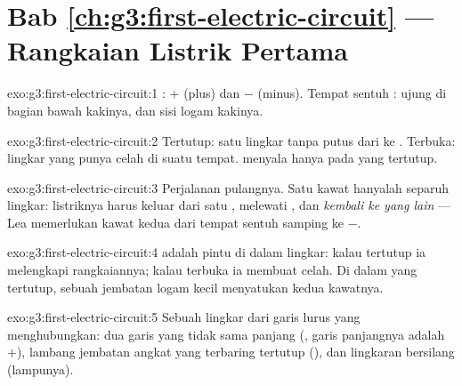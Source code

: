 \section*{Bab \ref{ch:g3:first-electric-circuit} --- Rangkaian Listrik Pertama}

\begin{solution}{exo:g3:first-electric-circuit:1}
 : $+$ (plus) dan $-$ (minus). Tempat sentuh : ujung
di bagian bawah kakinya, dan sisi logam kakinya.
\end{solution}

\begin{solution}{exo:g3:first-electric-circuit:2}
Tertutup: satu lingkar tanpa putus dari  ke . Terbuka:
lingkar yang punya celah di suatu tempat.  menyala hanya pada
yang tertutup.
\end{solution}

\begin{solution}{exo:g3:first-electric-circuit:3}
Perjalanan pulangnya. Satu kawat hanyalah separuh lingkar: listriknya
harus keluar dari satu , melewati , dan \emph{kembali ke
 yang lain} --- Lea memerlukan kawat kedua dari tempat sentuh
samping  ke  $-$.
\end{solution}

\begin{solution}{exo:g3:first-electric-circuit:4}
 adalah pintu di dalam lingkar: kalau tertutup ia melengkapi
rangkaiannya; kalau terbuka ia membuat celah. Di dalam  yang
tertutup, sebuah jembatan logam kecil menyatukan kedua kawatnya.
\end{solution}

\begin{solution}{exo:g3:first-electric-circuit:5}
Sebuah lingkar dari garis lurus yang menghubungkan: dua garis yang
tidak sama panjang (, garis panjangnya adalah $+$), lambang
jembatan angkat yang terbaring tertutup (), dan lingkaran
bersilang (lampunya).
\end{solution}

